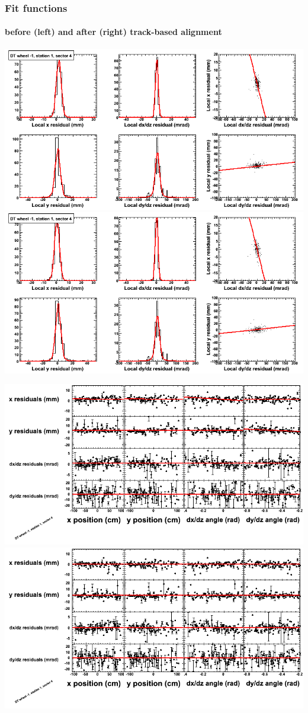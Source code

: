 \documentclass[compress]{beamer}
\begin{document}
\begin{frame}
\frametitle{Fit functions}
\framesubtitle{before (left) and after (right) track-based alignment}
\includegraphics[width=0.5\linewidth]{fitfunctions_re01/MBwhBst1sec04_bellcurves.png} \includegraphics[width=0.5\linewidth]{fitfunctions_re05/MBwhBst1sec04_bellcurves.png}

\includegraphics[width=0.5\linewidth]{fitfunctions_re01/MBwhBst1sec04_polynomials.png} \includegraphics[width=0.5\linewidth]{fitfunctions_re05/MBwhBst1sec04_polynomials.png}
\end{frame}
\end{document}
